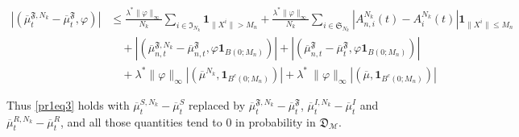 \documentclass[notitlepage,reqno,11pt]{amsart}
\numberwithin{equation}{section}
\begin{document}
\begin{align*}
  \left|( \overline{\mu}_{t}^{\mathfrak{F},N_k}-\overline{\mu}_{t}^{\mathfrak{F}},\varphi ) \right|&\leq\frac{\lambda^*\|\varphi\|_{\infty}}{N_k}\sum_{i\in \mathfrak{I}_{N_k}}\mathbf{1}_{\|X^i\|>M_n}+\frac{\lambda^*\|\varphi\|_{\infty}}{N_k}\sum_{i\in\mathfrak{S}_{N_k}}\left|A_{n,i}^{N_k}(t)-A_{i}^{N_k}(t)\right|\mathbf{1}_{\|X^i\|\leq M_n}\\
  &\quad+\left|(  \overline{\mu}_{n,t}^{\mathfrak{F},N_k}- \overline{\mu}_{n,t}^{\mathfrak{F}},\varphi \mathbf{1}_{B(0;M_n)})\right|
  +\left|(  \overline{\mu}_{n,t}^{\mathfrak{F}}- \overline{\mu}_{t}^{\mathfrak{F}},\varphi \mathbf{1}_{B(0;M_n)})\right|\\
  &\quad+\lambda^* \|\varphi\|_{\infty}\left|( \overline{\mu}^{N_k}, \mathbf{1}_{B^c(0;M_n) })\right|+\lambda^*\ \|\varphi\|_{\infty}\left|( \overline{\mu}, \mathbf{1}_{B^c(0;M_n) })\right|
\end{align*}

Thus \eqref{pr1eq3} holds with $\overline{\mu}_{t}^{S,N_k}-\overline{\mu}_{t}^{S}$ replaced by 
$\overline{\mu}_{t}^{\mathfrak{F},N_k}-\overline{\mu}_{t}^{\mathfrak{F}}$, $\overline{\mu}_{t}^{I,N_k}-\overline{\mu}_{t}^{I}$ and $\overline{\mu}_{t}^{R,N_k}-\overline{\mu}_{t}^{R}$, and all those quantities tend to $0$ in probability in $\mathfrak{D}_{\mathcal{M}}$.
\end{document}
